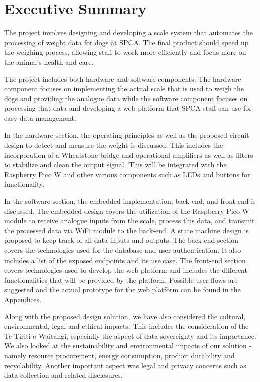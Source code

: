 
\chapter{Executive Summary}

The project involves designing and developing a scale system that automates the processing of weight data for dogs at SPCA. The final product should speed up the weighing process, allowing staff to work more efficiently and focus more on the animal's health and care.

The project includes both hardware and software components. The hardware component focuses on implementing the actual scale that is used to weigh the dogs and providing the analogue data while the software component focuses on processing that data and developing a web platform that SPCA staff can use for easy data management.

In the hardware section, the operating principles as well as the proposed circuit design to detect and measure the weight is discussed. This includes the incorporation of a Wheatstone bridge and operational amplifiers as well as filters to stabilize and clean the output signal. This will be integrated with the Raspberry Pico W and other various components such as LEDs and buttons for functionality. 

In the software section, the embedded implementation, back-end, and front-end is discussed. The embedded design covers the utilization of the Raspberry Pico W module to receive analogue inputs from the scale, process this data, and transmit the processed data via  WiFi module to the back-end. A state machine design is proposed to keep track of all data inputs and outputs. The back-end section covers  the technologies used for the database and user authentication. It also includes a list of the exposed endpoints and its use case. The front-end section covers technologies used to develop the web platform and includes the different functionalities that will be provided by the platform. Possible user flows are suggested and the actual prototype for the web platform can be found in the Appendices.

Along with the proposed design solution, we have also considered the cultural, environmental, legal and ethical impacts. This includes the consideration of the Te Tiriti o Waitangi, especially the aspect of data sovereignty and its importance. We also looked at the sustainability and environmental impacts of our solution - namely resource procurement, energy consumption, product durability and recyclability. Another important aspect was legal and privacy concerns such as data collection and related disclosures.